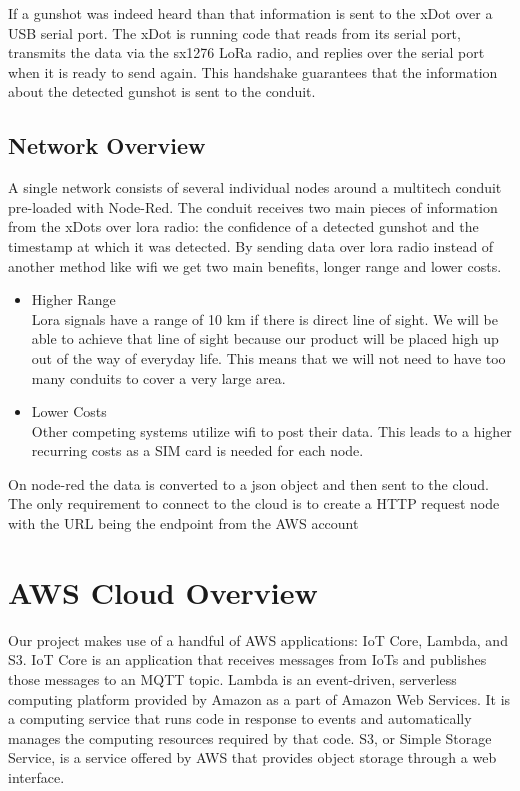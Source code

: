 \documentclass[conference]{IEEEtran}
\begin{document}
If a gunshot was indeed heard than that information is sent to the xDot over a USB serial port. The xDot is running code that reads from its serial port, transmits the data via the sx1276 LoRa radio, and replies over the serial port when it is ready to send again. This handshake guarantees that the information about the detected gunshot is sent to the conduit.


\subsection{Network Overview}
A single network consists of several individual nodes around a multitech conduit pre-loaded with Node-Red. The conduit receives two main pieces of information from the xDots over lora radio: the confidence of a detected gunshot and the timestamp at which it was detected. By sending data over lora radio instead of another method like wifi we get two main benefits, longer range and lower costs.

 
\begin{itemize}
\item Higher Range\\  Lora signals have a range of 10 km if there is direct line of sight. 
We will be able to achieve that line of sight because our product will be placed high up out of the way of everyday life. This means that we will not need to have too many conduits to cover a very large area. 
\item Lower Costs \\ Other competing systems utilize wifi to post their data. This leads to a higher recurring costs as a SIM card is needed for each node.

\end{itemize}

On node-red the data is converted to a json object and then sent to the cloud. The only requirement to connect to the cloud is to create a HTTP request node with the URL being the endpoint from the AWS account
\section{AWS Cloud Overview}

Our project makes use of a handful of AWS applications: IoT Core, Lambda, and S3. IoT Core is an application that receives messages from IoTs and publishes those messages to an MQTT topic. Lambda is an event-driven, serverless computing platform provided by Amazon as a part of Amazon Web Services. It is a computing service that runs code in response to events and automatically manages the computing resources required by that code. S3, or Simple Storage Service, is a service offered by AWS that provides object storage through a web interface.
\end{document}
